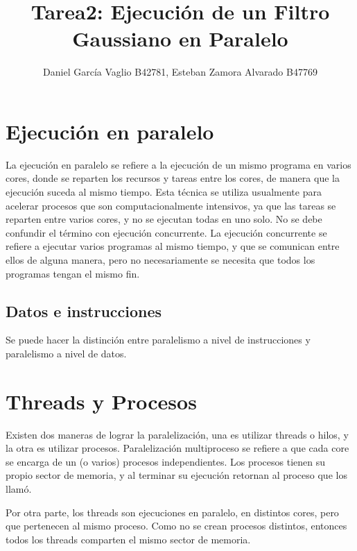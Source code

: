 \documentclass {article}
\begin{document}
\title{Tarea2: Ejecuci\'on de un Filtro Gaussiano en Paralelo}
\author{Daniel García Vaglio B42781, Esteban Zamora Alvarado B47769}

\maketitle

\section{Ejecución en paralelo}

La ejecución en paralelo se refiere a la ejecución de un mismo programa en varios cores, donde
se reparten los recursos y tareas entre los cores, de manera que la ejecución suceda al mismo
tiempo. %
Esta técnica se utiliza  usualmente para acelerar procesos que son computacionalmente intensivos, ya
que las tareas se reparten entre varios cores, y no se ejecutan todas en uno solo. No se debe
confundir el término con ejecución concurrente. %
La ejecución concurrente se refiere a ejecutar varios programas al mismo tiempo, y que se comunican
entre ellos de alguna manera, pero no necesariamente se necesita que todos los programas tengan el
mismo fin.

\subsection{Datos e instrucciones}
Se puede hacer la distinción entre paralelismo a nivel de instrucciones y paralelismo a nivel de
datos.

\section{Threads y Procesos}

Existen dos maneras de lograr la paralelización, una es utilizar threads o hilos, y la otra es
utilizar procesos. Paralelización multiproceso se refiere a que cada core se encarga de un (o varios) procesos
independientes. Los procesos tienen su propio sector de memoria, y al terminar su ejecución retornan
al proceso que los llamó. %

Por otra parte, los threads son ejecuciones en paralelo, en distintos cores, pero que pertenecen al
mismo proceso. Como no se crean procesos distintos, entonces todos los threads comparten el mismo
sector de memoria. %
\end{document}
